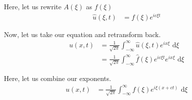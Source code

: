 Here, let us rewrite $A(\xi)$ as $f(\xi)$
%
\begin{align}
  \hat u(\xi, t) & = f(\xi) e^{i c \xi t}
\end{align}

Now, let us take our equation and retransform back.
%
\begin{align}
  u(x, t) & = \frac{1}{\sqrt{2 \pi}} \int^\infty_{-\infty} \hat u(\xi, t) e^{i x \xi} \text{ d}\xi\\
  & = \frac{1}{\sqrt{2 \pi}} \int^\infty_{-\infty} \hat f(\xi) e^{i c \xi t} e^{i x \xi} \text{ d}\xi
\end{align}

Here, let us combine our exponents.
%
\begin{align}
  u(x, t) & = \frac{1}{\sqrt{2 \pi}} \int^\infty_{-\infty} f(\xi) e^{i \xi(x + ct)} \text{ d}\xi
\end{align}
